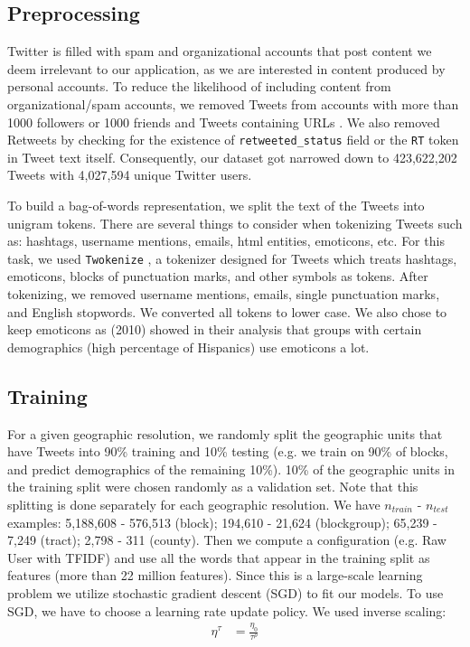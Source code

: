 \documentclass[letterpaper]{article}
\begin{document}
\subsection{Preprocessing}

Twitter is filled with spam and organizational accounts that post content we deem irrelevant to our application, as we are interested in content produced by personal accounts. To reduce the likelihood of including content from organizational/spam accounts, we removed Tweets from accounts with more than 1000 followers or 1000 friends \cite{lee2011seven,mccorriston2015organizations} and Tweets containing URLs \cite{guo2014detecting}. We also removed Retweets by checking for the existence of \texttt{retweeted\_status} field or the \texttt{RT} token in Tweet text itself. Consequently, our dataset got narrowed down to 423,622,202 Tweets with 4,027,594 unique Twitter users.

To build a bag-of-words representation, we split the text of the Tweets into unigram tokens. There are several things to consider when tokenizing Tweets such as: hashtags, username mentions, emails, html entities, emoticons, etc. For this task, we used \texttt{Twokenize} \cite{tokenizepy}, a tokenizer designed for Tweets which treats hashtags, emoticons, blocks of punctuation marks, and other symbols as tokens. After tokenizing, we removed username mentions, emails, single punctuation marks, and English stopwords. We converted all tokens to lower case. We also chose to keep emoticons as \citeauthor{o2010mixture} (2010) showed in their analysis that groups with certain demographics (high percentage of Hispanics) use emoticons a lot. 

\subsection{Training}

For a given geographic resolution, we randomly split the geographic units that have Tweets into 90\% training and 10\% testing (e.g. we train on 90\% of blocks, and predict  demographics of the remaining 10\%). 10\% of the geographic units in the training split were chosen randomly as a validation set. Note that this splitting is done separately for each geographic resolution. We have $n_{train}$ - $n_{test}$ examples: 5,188,608 - 576,513 (block); 194,610 - 21,624 (blockgroup); 65,239 - 7,249 (tract); 2,798 - 311 (county). Then we compute a configuration (e.g. Raw User with TFIDF) and use all the words that appear in the training split as features (more than 22 million features). Since this is a large-scale learning problem we utilize stochastic gradient descent (SGD) to fit our models. To use SGD, we have to choose a learning rate update policy. We used inverse scaling:
\begin{align*}
    \eta^{\tau} &= \frac{\eta_0}{\tau^\rho}
\end{align*}
\end{document}
